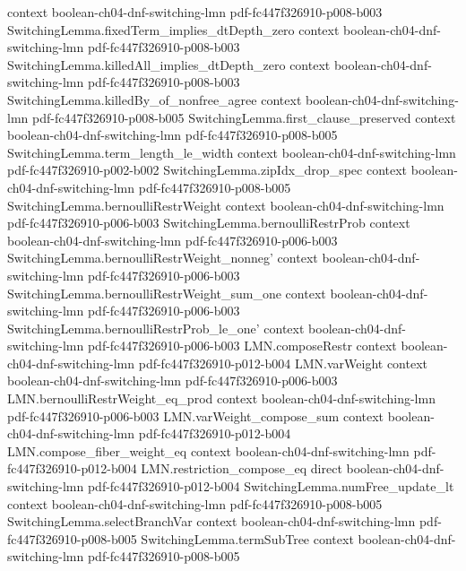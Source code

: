 \begin{theorem}
  {context}
  {boolean-ch04-dnf-switching-lmn}
  {pdf-fc447f326910-p008-b003}
\proofstep
  {SwitchingLemma.fixedTerm_implies_dtDepth_zero}
  {context}
  {boolean-ch04-dnf-switching-lmn}
  {pdf-fc447f326910-p008-b003}
\proofstep
  {SwitchingLemma.killedAll_implies_dtDepth_zero}
  {context}
  {boolean-ch04-dnf-switching-lmn}
  {pdf-fc447f326910-p008-b003}
\proofstep
  {SwitchingLemma.killedBy_of_nonfree_agree}
  {context}
  {boolean-ch04-dnf-switching-lmn}
  {pdf-fc447f326910-p008-b005}
\proofstep
  {SwitchingLemma.first_clause_preserved}
  {context}
  {boolean-ch04-dnf-switching-lmn}
  {pdf-fc447f326910-p008-b005}
\proofstep
  {SwitchingLemma.term_length_le_width}
  {context}
  {boolean-ch04-dnf-switching-lmn}
  {pdf-fc447f326910-p002-b002}
\proofstep
  {SwitchingLemma.zipIdx_drop_spec}
  {context}
  {boolean-ch04-dnf-switching-lmn}
  {pdf-fc447f326910-p008-b005}
\proofstep
  {SwitchingLemma.bernoulliRestrWeight}
  {context}
  {boolean-ch04-dnf-switching-lmn}
  {pdf-fc447f326910-p006-b003}
\proofstep
  {SwitchingLemma.bernoulliRestrProb}
  {context}
  {boolean-ch04-dnf-switching-lmn}
  {pdf-fc447f326910-p006-b003}
\proofstep
  {SwitchingLemma.bernoulliRestrWeight_nonneg'}
  {context}
  {boolean-ch04-dnf-switching-lmn}
  {pdf-fc447f326910-p006-b003}
\proofstep
  {SwitchingLemma.bernoulliRestrWeight_sum_one}
  {context}
  {boolean-ch04-dnf-switching-lmn}
  {pdf-fc447f326910-p006-b003}
\proofstep
  {SwitchingLemma.bernoulliRestrProb_le_one'}
  {context}
  {boolean-ch04-dnf-switching-lmn}
  {pdf-fc447f326910-p006-b003}
\proofstep
  {LMN.composeRestr}
  {context}
  {boolean-ch04-dnf-switching-lmn}
  {pdf-fc447f326910-p012-b004}
\proofstep
  {LMN.varWeight}
  {context}
  {boolean-ch04-dnf-switching-lmn}
  {pdf-fc447f326910-p006-b003}
\proofstep
  {LMN.bernoulliRestrWeight_eq_prod}
  {context}
  {boolean-ch04-dnf-switching-lmn}
  {pdf-fc447f326910-p006-b003}
\proofstep
  {LMN.varWeight_compose_sum}
  {context}
  {boolean-ch04-dnf-switching-lmn}
  {pdf-fc447f326910-p012-b004}
\proofstep
  {LMN.compose_fiber_weight_eq}
  {context}
  {boolean-ch04-dnf-switching-lmn}
  {pdf-fc447f326910-p012-b004}
\proofstep
  {LMN.restriction_compose_eq}
  {direct}
  {boolean-ch04-dnf-switching-lmn}
  {pdf-fc447f326910-p012-b004}
\proofstep
  {SwitchingLemma.numFree_update_lt}
  {context}
  {boolean-ch04-dnf-switching-lmn}
  {pdf-fc447f326910-p008-b005}
\proofstep
  {SwitchingLemma.selectBranchVar}
  {context}
  {boolean-ch04-dnf-switching-lmn}
  {pdf-fc447f326910-p008-b005}
\proofstep
  {SwitchingLemma.termSubTree}
  {context}
  {boolean-ch04-dnf-switching-lmn}
  {pdf-fc447f326910-p008-b005}

\end{theorem}

